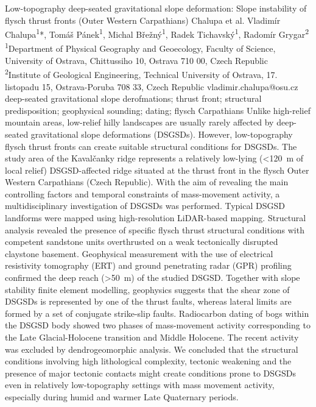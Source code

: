 
\abstract
{Low-topography deep-seated gravitational slope deformation: Slope instability of flysch thrust fronts (Outer Western Carpathians)} 
{Chalupa et al.} 
{Vladimír Chalupa\textsuperscript{1}*, Tomáš Pánek\textsuperscript{1}, Michal Břežný\textsuperscript{1}, Radek Tichavský\textsuperscript{1}, Radomír Grygar\textsuperscript{2}} 
{\TLtag} 
{
\textsuperscript{1}Department of Physical Geography and Geoecology, Faculty of Science, University of Ostrava, Chittussiho 10, Ostrava 710 00, Czech Republic\\
\textsuperscript{2}Institute of Geological Engineering, Technical University of Ostrava, 17. listopadu 15, Ostrava-Poruba 708 33, Czech Republic
}
{vladimir.chalupa@osu.cz}  %
{deep-seated gravitational slope derofmations; thrust front; structural predisposition; geophysical sounding; dating; flysch Carpathians}
{Unlike high-relief mountain areas, low-relief hilly landscapes are usually rarely affected by deep-seated gravitational slope deformations (DSGSDs). However, low-topography flysch thrust fronts can create suitable structural conditions for DSGSDs. The study area of the Kavalčanky ridge represents a relatively low-lying (<120~m of local relief) DSGSD-affected ridge situated at the thrust front in the flysch Outer Western Carpathians (Czech Republic). With the aim of revealing the main controlling factors and temporal constraints of mass-movement activity, a multidisciplinary investigation of DSGSDs was performed. Typical DSGSD landforms were mapped using high-resolution LiDAR-based mapping. Structural analysis revealed the presence of specific flysch thrust structural conditions with competent sandstone units overthrusted on a weak tectonically disrupted claystone basement. Geophysical measurement with the use of electrical resistivity tomography (ERT) and ground penetrating radar (GPR) profiling confirmed the deep reach (>50~m) of the studied DSGSD. Together with slope stability finite element modelling, geophysics suggests that the shear zone of DSGSDs is represented by one of the thrust faults, whereas lateral limits are formed by a set of conjugate strike-slip faults. Radiocarbon dating of bogs within the DSGSD body showed two phases of mass-movement activity corresponding to the Late Glacial-Holocene transition and Middle Holocene. The recent activity was excluded by dendrogeomorphic analysis. We concluded that the structural conditions involving high lithological complexity, tectonic weakening and the presence of major tectonic contacts might create conditions prone to DSGSDs even in relatively low-topography settings with mass movement activity, especially during humid and warmer Late Quaternary periods.
}
